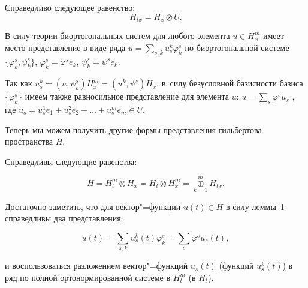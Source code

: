 \smallskip



\hypertarget{korn:lemma:1}{}



\begin{lemma}[1]Справедливо следующее равенство\/{\rm:} $$H_{tx}=H_x\otimes U.$$\end{lemma}



\smallskip





В силу теории биортогональных систем для любого элемента $u\in H_x^m$ имеет место представление в виде ряда $u=\sum _{s,k}{u_s^k\varphi_k^s}$ по биортогональной системе $\{\varphi_k^s,\psi_k^s\}$, $\varphi_k^s=\varphi^s e_k$, $\psi_k^s=\psi^se_k$. 

Так как $u_s^k=(u,\psi_k^s)H_x^m=(u^k,\psi^s)H_x$, в~силу безусловной базисности базиса $\{\varphi_k^s\}$ имеем также равносильное представление для элемента $u$: $u=\sum _s{\varphi^su_s}$ , где $u_s=u_s^1 e_1 +  u_s^2 e_2 +\dots+u_s^m e_m\in U$.



Теперь мы можем получить другие формы представления гильбертова пространства $H$.



\smallskip



\hypertarget{korn:lemma:2}{}



\begin{lemma}[2]Справедливы следующие равенства\/{\rm:}

$$

H=H_t^m\otimes H_x=H_t\otimes H_x^m=\mathop\oplus\limits_{k=1}^m H_{tx} .

$$

\end{lemma}



\smallskip



Достаточно заметить, что для вектор"=функции $u(t)\in H$ в силу леммы~\hyperlink{korn:lemma:1}{1} справедливы два представления: 

$$u(t)=\sum\limits_{s,k}{u_s^k(t)\varphi_k^s=\sum\limits_s{\varphi^su_s(t)}},$$ 

и воспользоваться разложением вектор"=функций $u_s(t)$ (функций $u_s^k(t)$) в ряд по полной ортонормированной системе в $H_t^m $ (в $H_t$).



